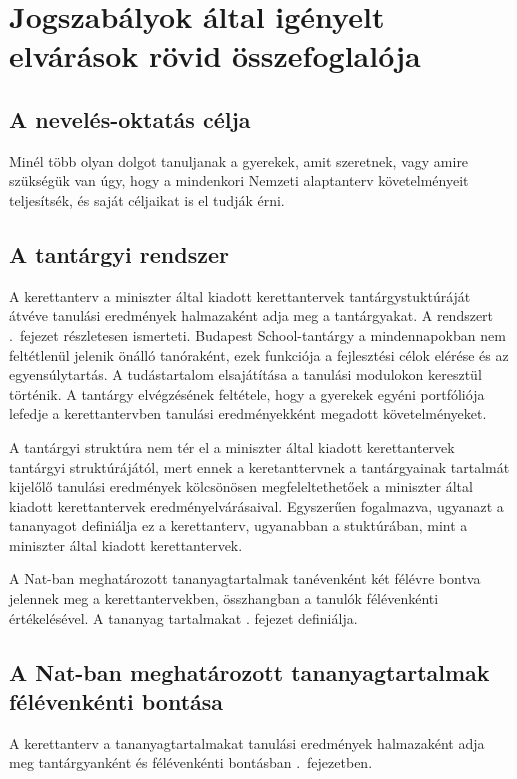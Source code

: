 \chapter{Jogszabályok által igényelt elvárások rövid összefoglalója}
\label{sec:jogszabalyok}
\section{A nevelés-oktatás célja}

Minél több olyan dolgot tanuljanak a gyerekek, amit szeretnek, vagy amire szükségük van úgy, hogy a mindenkori Nemzeti alaptanterv követelményeit teljesítsék, és saját céljaikat is el tudják érni.

\section{A tantárgyi rendszer}
\label{sec:jog_tantargy}
A kerettanterv a miniszter által kiadott kerettantervek tantárgystuktúráját átvéve tanulási eredmények halmazaként adja meg a tantárgyakat. A rendszert .~fejezet részletesen ismerteti.  Budapest School-tantárgy a mindennapokban nem feltétlenül jelenik önálló tanóraként, ezek funkciója a fejlesztési célok elérése és az egyensúlytartás. A tudástartalom elsajátítása a tanulási modulokon keresztül történik. A tantárgy elvégzésének feltétele, hogy  a gyerekek egyéni portfóliója lefedje a kerettantervben tanulási eredményekként megadott követelményeket.

A tantárgyi struktúra nem tér el a miniszter által kiadott kerettantervek tantárgyi struktúrájától, mert ennek a keretanttervnek a tantárgyainak tartalmát kijelőlő tanulási eredmények kölcsönösen megfeleltethetőek a miniszter által kiadott kerettantervek eredményelvárásaival. Egyszerűen fogalmazva, ugyanazt a tananyagot definiálja ez a kerettanterv, ugyanabban a stuktúrában, mint a miniszter által kiadott kerettantervek. 

A Nat-ban meghatározott tananyagtartalmak tanévenként két félévre bontva jelennek meg a kerettantervekben, összhangban a tanulók félévenkénti értékelésével. A tananyag 
tartalmakat . fejezet definiálja.

\section{A Nat-ban meghatározott tananyagtartalmak félévenkénti bontása}
A kerettanterv a tananyagtartalmakat tanulási eredmények halmazaként adja meg tantárgyanként és félévenkénti bontásban .~fejezetben. 


